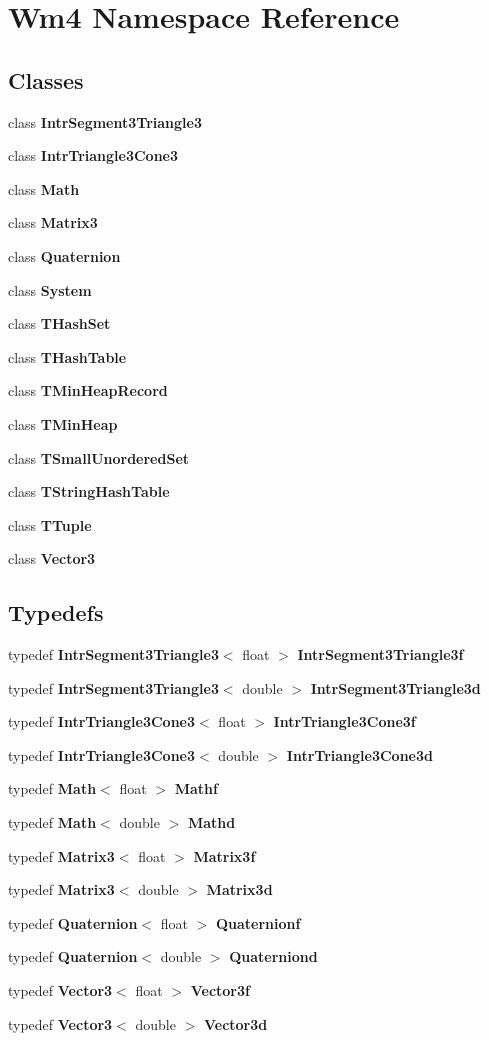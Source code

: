\section{Wm4 Namespace Reference}
\label{namespaceWm4}


\subsection*{Classes}
\begin{CompactItemize}
\item 
class {\bf Intr\-Segment3Triangle3}
\item 
class {\bf Intr\-Triangle3Cone3}
\item 
class {\bf Math}
\item 
class {\bf Matrix3}
\item 
class {\bf Quaternion}
\item 
class {\bf System}
\item 
class {\bf THash\-Set}
\item 
class {\bf THash\-Table}
\item 
class {\bf TMin\-Heap\-Record}
\item 
class {\bf TMin\-Heap}
\item 
class {\bf TSmall\-Unordered\-Set}
\item 
class {\bf TString\-Hash\-Table}
\item 
class {\bf TTuple}
\item 
class {\bf Vector3}
\end{CompactItemize}
\subsection*{Typedefs}
\begin{CompactItemize}
\item 
typedef {\bf Intr\-Segment3Triangle3}$<$ float $>$ {\bf Intr\-Segment3Triangle3f}
\item 
typedef {\bf Intr\-Segment3Triangle3}$<$ double $>$ {\bf Intr\-Segment3Triangle3d}
\item 
typedef {\bf Intr\-Triangle3Cone3}$<$ float $>$ {\bf Intr\-Triangle3Cone3f}
\item 
typedef {\bf Intr\-Triangle3Cone3}$<$ double $>$ {\bf Intr\-Triangle3Cone3d}
\item 
typedef {\bf Math}$<$ float $>$ {\bf Mathf}
\item 
typedef {\bf Math}$<$ double $>$ {\bf Mathd}
\item 
typedef {\bf Matrix3}$<$ float $>$ {\bf Matrix3f}
\item 
typedef {\bf Matrix3}$<$ double $>$ {\bf Matrix3d}
\item 
typedef {\bf Quaternion}$<$ float $>$ {\bf Quaternionf}
\item 
typedef {\bf Quaternion}$<$ double $>$ {\bf Quaterniond}
\item 
typedef {\bf Vector3}$<$ float $>$ {\bf Vector3f}
\item 
typedef {\bf Vector3}$<$ double $>$ {\bf Vector3d}
\end{CompactItemize}
